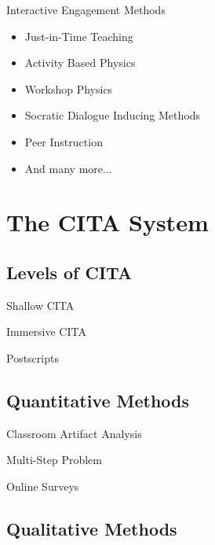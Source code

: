 \documentclass{beamer}
\begin{document}
\begin{frame}{Interactive Engagement Methods}
\begin{itemize}
\item Just-in-Time Teaching
\item Activity Based Physics
\item Workshop Physics
\item Socratic Dialogue Inducing Methods
\item Peer Instruction
\item And many more...
\end{itemize}
\end{frame}

\section{The CITA System}

\subsection*{Levels of CITA}

\begin{frame}{Shallow CITA}
\end{frame}

\begin{frame}{Immersive CITA}
\end{frame}

\begin{frame}{Postscripts}
\end{frame}

\subsection*{Quantitative Methods}

\begin{frame}{Classroom Artifact Analysis}
\end{frame}

\begin{frame}{Multi-Step Problem}
\end{frame}

\begin{frame}{Online Surveys}
\end{frame}

\subsection*{Qualitative Methods}
\end{document}
